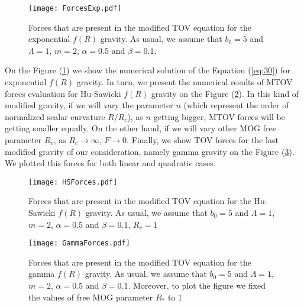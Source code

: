\begin{widetext}
\begin{figure}[H]
    \centering
    \texttt{[image: ForcesExp.pdf]}
    \caption{Forces that are present in the modified TOV equation for the exponential $f(R)$ gravity. As usual, we assume that $b_0=5$ and $\Lambda=1$, $m=2$, $\alpha=0.5$ and $\beta=0.1$.}
    \label{fig:5}
\end{figure}

\end{widetext}
On the Figure (\ref{fig:5}) we show the numerical solution of the Equation (\ref{eq:30}) for exponential $f(R)$ gravity.
In turn, we present the numerical results of MTOV forces evaluation for Hu-Sawicki $f(R)$ gravity on the Figure (\ref{fig:6}). In this kind of modified gravity, if we will vary the parameter $n$ (which represent the order of normalized scalar curvature $R/R_c$), as $n$ getting bigger, MTOV forces will be getting smaller equally. On the other hand, if we will vary other MOG free parameter $R_c$, as $R_c\to\infty$, $F\to 0$.
Finally, we show TOV forces for the last modified gravity of our consideration, namely gamma gravity on the Figure (\ref{fig:6a}). We plotted this forces for both linear and quadratic cases.
\begin{widetext}

\begin{figure}[!htbp]
    \centering
    \texttt{[image: HSForces.pdf]}
    \caption{Forces that are present in the modified TOV equation for the Hu-Sawicki $f(R)$ gravity. As usual, we assume that $b_0=5$ and $\Lambda=1$, $m=2$, $\alpha=0.5$ and $\beta=0.1$, $R_c=1$}
    \label{fig:6}
\end{figure}



\begin{figure}[!htbp]
    \centering
    \texttt{[image: GammaForces.pdf]}
    \caption{Forces that are present in the modified TOV equation for the gamma $f(R)$ gravity. As usual, we assume that $b_0=5$ and $\Lambda=1$, $m=2$, $\alpha=0.5$ and $\beta=0.1$. Moreover, to plot the figure we fixed the values of free MOG parameter $R_*$ to 1}
    \label{fig:6a}
\end{figure}

\end{widetext}

